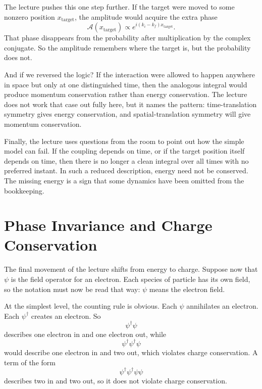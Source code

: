 The lecture pushes this one step further. If the target were moved to some nonzero position \(x_{\text{target}}\), the amplitude would acquire the extra phase
\begin{equation}
\mathcal A(x_{\text{target}})\propto e^{i(k_i-k_f)x_{\text{target}}}.
\end{equation}
That phase disappears from the probability after multiplication by the complex conjugate. So the amplitude remembers where the target is, but the probability does not.

And if we reversed the logic? If the interaction were allowed to happen anywhere in space but only at one distinguished time, then the analogous integral would produce momentum conservation rather than energy conservation. The lecture does not work that case out fully here, but it names the pattern: time-translation symmetry gives energy conservation, and spatial-translation symmetry will give momentum conservation.

Finally, the lecture uses questions from the room to point out how the simple model can fail. If the coupling depends on time, or if the target position itself depends on time, then there is no longer a clean integral over all times with no preferred instant. In such a reduced description, energy need not be conserved. The missing energy is a sign that some dynamics have been omitted from the bookkeeping.

\section{Phase Invariance and Charge Conservation}

The final movement of the lecture shifts from energy to charge. Suppose now that \(\psi\) is the field operator for an electron. Each species of particle has its own field, so the notation must now be read that way: \(\psi\) means the electron field.

At the simplest level, the counting rule is obvious. Each \(\psi\) annihilates an electron. Each \(\psi^\dagger\) creates an electron. So
\[
\psi^\dagger\psi
\]
describes one electron in and one electron out, while
\[
\psi^\dagger\psi^\dagger\psi
\]
would describe one electron in and two out, which violates charge conservation. A term of the form
\[
\psi^\dagger\psi^\dagger\psi\psi
\]
describes two in and two out, so it does not violate charge conservation.

